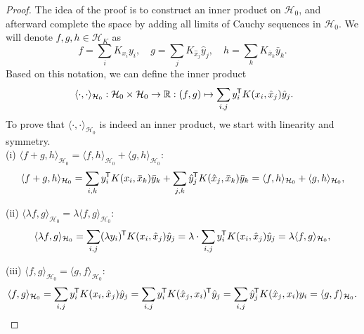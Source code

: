 \documentclass[11pt, a4paper]{article}
\newcommand{\R}{\mathbb{R}}
\renewcommand{\H}{\mathcal{H}}
\newcommand*{\tr}{^{\mkern-1.5mu\mathsf{T}}}
\begin{document}
\begin{proof}
The idea of the proof is to construct an inner product on $\H_0$, and afterward complete the space by adding all limits of Cauchy sequences in $\H_0$. We will denote  $f,g,h \in \H_K$ as
\[ f = \sum_{i} K_{x_i}y_i, \quad g = \sum_{j} K_{\hat{x}_j}\hat{y}_j, \quad h = \sum_{k} K_{\bar{x}_k}\bar{y}_k. \]
Based on this notation, we can define the inner product 
\[ \langle \cdot, \cdot \rangle_{\H_0} : \H_0 \times \H_0 \to \R : (f,g) \mapsto \sum_{i,j} y_i \tr K(x_i, \hat{x}_j) \hat{y}_j. \]
To prove that $\langle \cdot, \cdot \rangle_{\H_0}$ is indeed an inner product, we start with linearity and symmetry. \\

(i) $\langle f + g , h \rangle_{\H_0} = \langle f , h \rangle_{\H_0} + \langle g , h \rangle_{\H_0}$:
\[ \langle f + g , h \rangle_{\H_0} = \sum_{i,k} y_i \tr K(x_i, \bar{x}_k) \bar{y}_k +  \sum_{j,k} \hat{y}_j \tr K(\hat{x}_j, \bar{x}_k) \bar{y}_k = \langle f , h \rangle_{\H_0} + \langle g , h \rangle_{\H_0}, \]

(ii) $\langle \lambda f , g \rangle_{\H_0} = \lambda \langle f, g \rangle_{\H_0}$:
\[ \langle \lambda f , g \rangle_{\H_0} = \sum_{i,j} (\lambda y_i) \tr K(x_i, \hat{x}_j) \hat{y}_j = \lambda \cdot \sum_{i,j} y_i \tr K(x_i, \hat{x}_j) \hat{y}_j = \lambda \langle f, g \rangle_{\H_0},  \]

(iii) $\langle f , g \rangle_{\H_0} = \langle g , f \rangle_{\H_0}$:
\[ \langle f , g \rangle_{\H_0} = \sum_{i,j} y_i \tr K(x_i, \hat{x}_j) \hat{y}_j = \sum_{i,j} y_i \tr K(\hat{x}_j,x_i) \tr \hat{y}_j = \sum_{i,j} \hat{y}_j \tr K(\hat{x}_j, x_i) y_i = \langle g , f \rangle_{\H_0}. \]


\end{proof}
\end{document}
